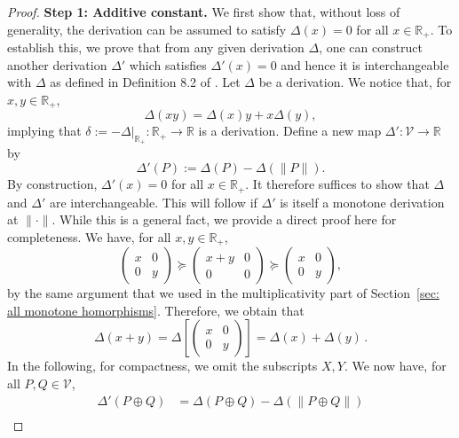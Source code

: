 \documentclass[aps,pra,11pt,onecolumn,nofootinbib,tightenlines]{revtex4-2}
\theoremstyle{definition}
\newcommand{\V}{\mathcal{V}}
\newcommand{\mb}[1]{\mathbb{#1}}
\begin{document}
\begin{proof}
\noindent\textbf{Step 1: Additive constant.} We first show that, without loss of generality, the derivation can be assumed to satisfy $\Delta(x) = 0$ for all $x \in \mathbb{R}_+$. To establish this, we prove that from any given derivation $\Delta$, one can construct another derivation $\Delta'$ which satisfies $\Delta'(x) =0$ and hence it is interchangeable with $\Delta$ as defined in Definition 8.2 of \cite{fritz2023abstractII}. Let $\Delta$ be a derivation.  We notice that, for $x,y\in\mb R_+$,
\begin{equation}
\Delta(xy)=\Delta(x)y+x\Delta(y),
\end{equation}
implying that $\delta:=-\Delta|_{\mb R_+}:\mb R_+\to\mb R$ is a derivation.
Define a new map $\Delta' \colon \mathcal{V} \to \mathbb{R}$ by
\begin{equation}
    \Delta'(P) := \Delta(P) - \Delta(\|P\|).
\end{equation}
By construction, $\Delta'(x) = 0$ for all $x \in \mathbb{R}_+$. It therefore suffices to show that $\Delta$ and $\Delta'$ are interchangeable. This will follow if $\Delta'$ is itself a monotone derivation at $\|\cdot\|$. While this is a general fact, we provide a direct proof here for completeness. We have, for all $x,y\in\mb R_+$,
\begin{equation}
\left(\begin{array}{cc}
x&0\\
0&y
\end{array}\right)\succeq\left(\begin{array}{cc}
x+y&0\\
0&0
\end{array}\right)\succeq\left(\begin{array}{cc}
x&0\\
0&y
\end{array}\right),
\end{equation}
by the same argument that we used in the multiplicativity part of Section~\ref{sec: all monotone homorphisms}. Therefore, we obtain that
\begin{equation}
\Delta(x+y)=\Delta\left[\left(\begin{array}{cc}
x&0\\
0&y
\end{array}\right)\right]=\Delta(x)+\Delta(y)\,.
\end{equation}
In the following, for compactness, we omit the subscripts $X,Y$.
We now have, for all $P,Q\in\V$,
\begin{align}
\Delta'(P\oplus Q)&=\Delta(P\oplus Q)-\Delta(\|P\oplus Q\|)\\

\end{align}
\end{proof}
\end{document}
